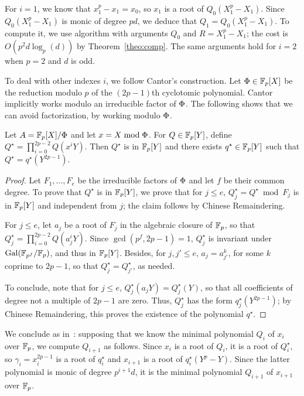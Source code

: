 For $i=1$, we know that $x_1^p-x_1=x_0$, so $x_1$ is a root of
$Q_0(X_1^p-X_1)$. Since $Q_0(X_1^p-X_1)$ is monic of degree $pd$, we
deduce that $Q_1=Q_0(X_1^p-X_1)$. To compute it, we use algorithm
 with arguments $Q_0$ and $R=X_1^p-X_1$; the cost is
$O(p^2d \log_p(d))$ by Theorem~\ref{theo:comp}. The same arguments
hold for $i=2$ when $p=2$ and $d$ is odd.

To deal with other indexes $i$, we follow Cantor's construction.  Let
$\Phi\in \mathbb{F}_p[X]$ be the reduction modulo $p$ of the $(2p-1)$th
cyclotomic polynomial. Cantor implicitly works modulo an irreducible
factor of $\Phi$. The following shows that we can avoid
factorization, by working modulo $\Phi$.

\begin{lemma}
  \label{lemma:poly-cyclic}
  Let $A=\mathbb{F}_p[X]/\Phi$ and let $x = X \bmod
  \Phi$. For $Q\in\mathbb{F}_p[Y]$, define $Q^\star =
  \prod_{i=0}^{2p-2}Q(x^iY).$ Then $Q^\star$ is in $\mathbb{F}_p[Y]$ and there
  exists $q^\star\in\mathbb{F}_p[Y]$ such that $Q^\star = q^\star(Y^{2p-1})$.
\end{lemma}
\begin{proof} Let $F_1,\dots,F_e$ be the irreducible factors of $\Phi$
and let $f$ be their common degree. To prove that $Q^\star$ is in
$\mathbb{F}_p[Y]$, we prove that for $j \le e$, $Q^\star_j = Q^\star \bmod
F_j$ is in $\mathbb{F}_p[Y]$ and independent from $j$; the claim follows by
Chinese Remaindering.

For $j \le e$, let $a_j$ be a root of $F_j$ in the algebraic closure
of $\mathbb{F}_p$, so that $Q^\star_j = \prod_{i=0}^{2p-2}Q(a_j^iY).$ Since
$\gcd(p^f,2p-1)=1$, $Q^\star_j$ is invariant under ${\rm
  Gal}(\mathbb{F}_{p^f}/\mathbb{F}_p)$, and thus in $\mathbb{F}_p[Y]$. Besides, for $j,j'\le
e$, $a_j = a_{j'}^k$, for some $k$ coprime to $2p-1$, so that
$Q^\star_j= Q^\star_{j'}$, as needed.  

To conclude, note that for $j \le e$, $Q^\star_j(a_jY)=Q^\star_j(Y)$,
so that all coefficients of degree not a multiple of $2p-1$ are zero.
Thus, $Q^\star_j$ has the form $q^\star_j(Y^{2p-1})$; by Chinese
Remaindering, this proves the existence of the polynomial $q^\star$.
\end{proof}


\medskip

We conclude as in~\cite{Can89}: supposing that we
know the minimal polynomial $Q_i$ of $x_i$ over $\mathbb{F}_p$, we compute
$Q_{i+1}$ as follows. Since $x_i$ is a root of $Q_i$, it is a root of
$Q_i^\star$, so $\gamma_i=x_i^{2p-1}$ is a root of $q_i^\star$ and
$x_{i+1}$ is a root of $q_i^\star(Y^p-Y)$. Since the latter polynomial
is monic of degree $p^{i+1}d$, it is the minimal polynomial $Q_{i+1}$
of $x_{i+1}$ over $\mathbb{F}_p$.


